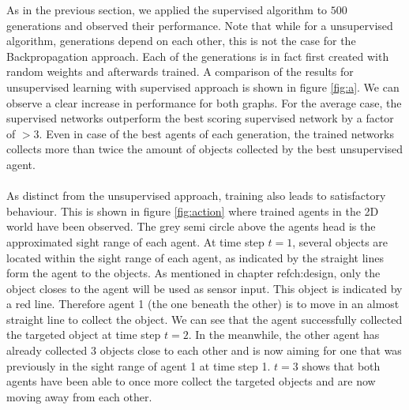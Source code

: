 \documentclass[10pt,a4paper,DIV=11]{scrreprt}
\begin{document}
\newpage
As in the previous section, we applied the supervised algorithm to $500$ generations and observed their performance. Note that while for a unsupervised
algorithm, generations depend on each other, this is not the case for the Backpropagation approach. Each of the generations is in fact first created
with random weights and afterwards trained. A comparison of the results for unsupervised learning with supervised approach is shown in figure \ref{fig:a}.
We can observe a clear increase in performance for both graphs. For the average case, the supervised networks outperform the best scoring supervised
network by a factor of $>3$. Even in case of the best agents of each generation, the trained networks collects more than twice the amount of objects
collected by the best unsupervised agent.
\\
\\As distinct from the unsupervised approach, training also leads to satisfactory behaviour. This is shown in figure \ref{fig:action} where 
trained agents in the 2D world have been observed. The grey semi circle above the agents head is the approximated sight range of each agent.
At time step $t=1$, several objects are located within the sight range of each agent, as indicated by the straight lines form the agent to the objects.
As mentioned in chapter ref{ch:design}, only the object closes to the agent will be used as sensor input. This object is indicated by a red line. Therefore
agent 1 (the one beneath the other) is to move in an almost straight line to collect the object. We can see that the agent successfully collected the targeted
object at time step $t=2$. In the meanwhile, the other agent has already collected 3 objects close to each other and is now aiming for one that was previously 
in the sight range of agent 1 at time step 1. $t=3$ shows that both agents have been able to once more collect the targeted objects and are now moving away 
from each other. 
\end{document}
